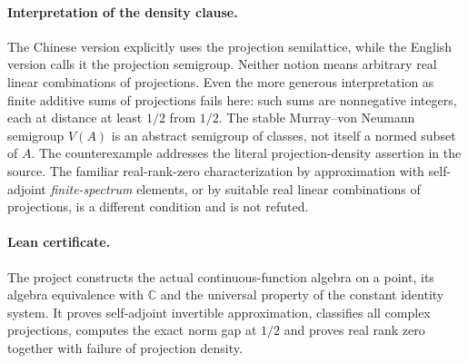 \documentclass[11pt]{article}
\begin{document}
\paragraph{Interpretation of the density clause.}
The Chinese version explicitly uses the projection semilattice, while the
English version calls it the projection semigroup. Neither notion means
arbitrary real linear combinations of projections. Even the more generous
interpretation as finite additive sums of projections fails here: such sums
are nonnegative integers, each at distance at least $1/2$ from $1/2$.
The stable Murray--von Neumann semigroup $V(A)$ is an abstract semigroup
of classes, not itself a normed subset of $A$. The counterexample addresses
the literal projection-density assertion in the source. The familiar
real-rank-zero characterization by approximation with self-adjoint
\emph{finite-spectrum} elements, or by suitable real linear combinations
of projections, is a different condition and is not refuted.

\paragraph{Lean certificate.}
The project constructs the actual continuous-function algebra on a point,
its algebra equivalence with $\mathbb C$ and the universal property of the
constant identity system. It proves self-adjoint invertible approximation,
classifies all complex projections, computes the exact norm gap at $1/2$
and proves real rank zero together with failure of projection density.
\end{document}

